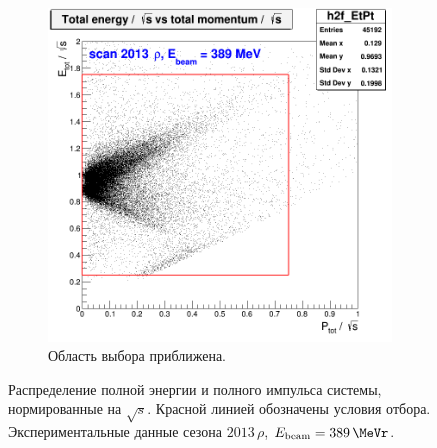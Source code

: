 \begin{figure}[htbp]
\begin{subfigure}[b]{0.45\textwidth}
        \includegraphics[width=\textwidth]{img/h2f_EtPt_zoom.png}
        \caption{Область выбора приближена.}
        \label{fig:3pi_EtPt_zoom}
    \end{subfigure}
    \caption{Распределение полной энергии и полного импульса системы,
        нормированные на $\sqrt{s}$.
        Красной линией обозначены условия отбора.
        Экспериментальные данные сезона $2013 \, \rho$,
        $E_{\text{beam}} = \SI{389}{\MeVr}$.}\label{fig:3pi_EtPt}
\end{figure}

